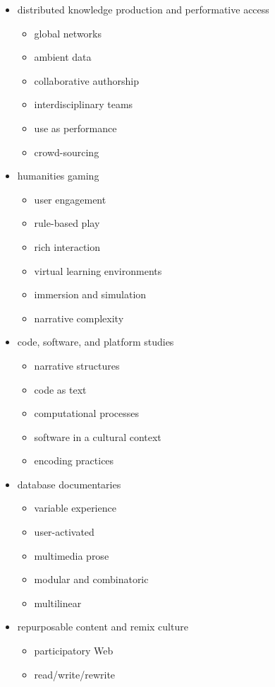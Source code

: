 \begin{itemize}
\begin{itemize}
  \end{itemize}
  \item distributed knowledge production and performative access
  \begin{itemize}
    \item global networks
    \item	ambient data
    \item	collaborative authorship
    \item	interdisciplinary teams
    \item	use as performance
    \item	crowd-sourcing
  \end{itemize}
  \item humanities gaming
  \begin{itemize}
    \item user engagement
    \item	rule-based play
    \item	rich interaction
    \item	virtual learning environments
    \item	immersion and simulation
    \item	narrative complexity
  \end{itemize}
  \item code, software, and platform studies
  \begin{itemize}
    \item narrative structures
    \item	code as text
    \item	computational processes
    \item	software in a cultural context
    \item	encoding practices
  \end{itemize}
  \item database documentaries
  \begin{itemize}
    \item variable experience
    \item	user-activated
    \item	multimedia prose
    \item	modular and combinatoric
    \item	multilinear
  \end{itemize}
  \item repurposable content and remix culture
  \begin{itemize}
    \item participatory Web
    \item	read/write/rewrite

\end{itemize}
\end{itemize}
